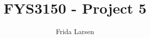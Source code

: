 \documentclass[notitlepage, reprint, nofootinbib]{revtex4-1}
\begin{document}
\title{FYS3150 - Project 5}
\author{Frida Larsen}

\begin{abstract}
{\color{red}{Such a great abstract}}
\end{abstract}

\maketitle
\end{document}

